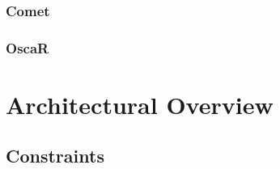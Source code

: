 \documentclass[a4paper,11pt]{article}
\begin{document}
    \subsubsection{Comet}
    \subsubsection{OscaR}
  

    
 
%  
\newpage
\section{Architectural Overview}  
  
  \newpage
  \subsection{Constraints}
  
\end{document}
